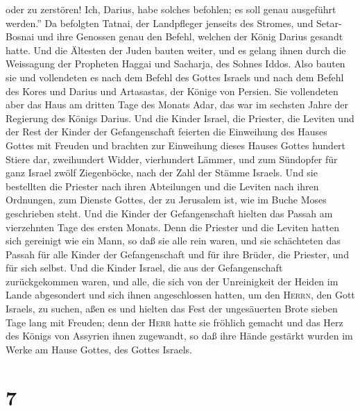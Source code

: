 oder zu zerstören! Ich, Darius, habe solches befohlen; es soll genau
ausgeführt werden.''  Da befolgten Tatnai, der
Landpfleger jenseits des Stromes, und Setar-Bosnai und ihre Genossen
genau den Befehl, welchen der König Darius gesandt hatte.
 Und die Ältesten der Juden bauten weiter, und es gelang
ihnen durch die Weissagung der Propheten Haggai und Sacharja, des Sohnes
Iddos. Also bauten sie und vollendeten es nach dem Befehl des Gottes
Israels und nach dem Befehl des Kores und Darius und Artasastas, der
Könige von Persien.  Sie vollendeten aber das Haus am
dritten Tage des Monats Adar, das war im sechsten Jahre der Regierung
des Königs Darius.  Und die Kinder Israel, die Priester,
die Leviten und der Rest der Kinder der Gefangenschaft feierten die
Einweihung des Hauses Gottes mit Freuden  und brachten
zur Einweihung dieses Hauses Gottes hundert Stiere dar, zweihundert
Widder, vierhundert Lämmer, und zum Sündopfer für ganz Israel zwölf
Ziegenböcke, nach der Zahl der Stämme Israels.  Und sie
bestellten die Priester nach ihren Abteilungen und die Leviten nach
ihren Ordnungen, zum Dienste Gottes, der zu Jerusalem ist, wie im Buche
Moses geschrieben steht.  Und die Kinder der
Gefangenschaft hielten das Passah am vierzehnten Tage des ersten Monats.
 Denn die Priester und die Leviten hatten sich gereinigt
wie ein Mann, so daß sie alle rein waren, und sie schächteten das Passah
für alle Kinder der Gefangenschaft und für ihre Brüder, die Priester,
und für sich selbst.  Und die Kinder Israel, die aus der
Gefangenschaft zurückgekommen waren, und alle, die sich von der
Unreinigkeit der Heiden im Lande abgesondert und sich ihnen
angeschlossen hatten, um den \textsc{Herrn}, den Gott Israels, zu
suchen, aßen es  und hielten das Fest der ungesäuerten
Brote sieben Tage lang mit Freuden; denn der \textsc{Herr} hatte sie
fröhlich gemacht und das Herz des Königs von Assyrien ihnen zugewandt,
so daß ihre Hände gestärkt wurden im Werke am Hause Gottes, des Gottes
Israels.

\hypertarget{section-6}{%
\section{7}\label{section-6}}

